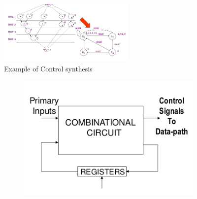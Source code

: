 \begin{figure}[H]
	\centering
	\includegraphics[width=0.60\textwidth]{./Cap5/Images/Image16.png}
	\caption{Example of Control synthesis}
	\label{fig:contrsynth}
\end{figure}

\begin{figure}[H]
	\centering
	\begin{subfigure}[b]{0.30\textwidth}
		\includegraphics[width=\textwidth]{./Cap5/Images/Image17.png}
		\caption{}
		\label{fig:hardWiredCU}
	\end{subfigure}
	\quad\quad\quad
	\begin{subfigure}[b]{0.30\textwidth}

\end{subfigure}
\end{figure}
